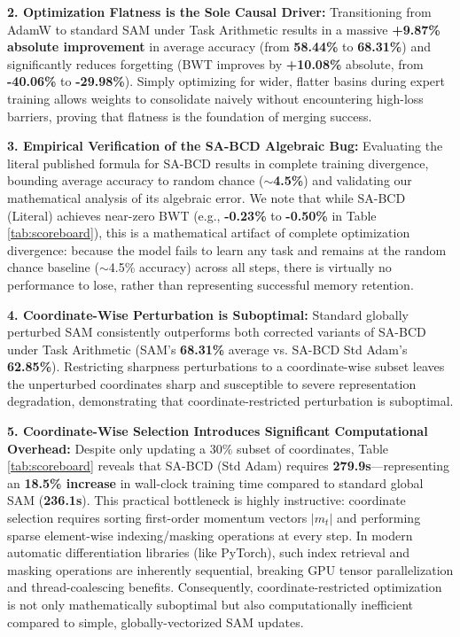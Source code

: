 \textbf{2. Optimization Flatness is the Sole Causal Driver:} Transitioning from AdamW to standard SAM under Task Arithmetic results in a massive \textbf{+9.87\% absolute improvement} in average accuracy (from \textbf{58.44\%} to \textbf{68.31\%}) and significantly reduces forgetting (BWT improves by \textbf{+10.08\%} absolute, from \textbf{-40.06\%} to \textbf{-29.98\%}). Simply optimizing for wider, flatter basins during expert training allows weights to consolidate naively without encountering high-loss barriers, proving that flatness is the foundation of merging success.

\textbf{3. Empirical Verification of the SA-BCD Algebraic Bug:} Evaluating the literal published formula for SA-BCD results in complete training divergence, bounding average accuracy to random chance (\textbf{$\sim$4.5\%}) and validating our mathematical analysis of its algebraic error. We note that while SA-BCD (Literal) achieves near-zero BWT (e.g., \textbf{-0.23\%} to \textbf{-0.50\%} in Table \ref{tab:scoreboard}), this is a mathematical artifact of complete optimization divergence: because the model fails to learn any task and remains at the random chance baseline ($\sim$4.5\% accuracy) across all steps, there is virtually no performance to lose, rather than representing successful memory retention.

\textbf{4. Coordinate-Wise Perturbation is Suboptimal:} Standard globally perturbed SAM consistently outperforms both corrected variants of SA-BCD under Task Arithmetic (SAM's \textbf{68.31\%} average vs. SA-BCD Std Adam's \textbf{62.85\%}). Restricting sharpness perturbations to a coordinate-wise subset leaves the unperturbed coordinates sharp and susceptible to severe representation degradation, demonstrating that coordinate-restricted perturbation is suboptimal.

\textbf{5. Coordinate-Wise Selection Introduces Significant Computational Overhead:} Despite only updating a $30\%$ subset of coordinates, Table \ref{tab:scoreboard} reveals that SA-BCD (Std Adam) requires \textbf{279.9s}—representing an \textbf{18.5\% increase} in wall-clock training time compared to standard global SAM (\textbf{236.1s}). This practical bottleneck is highly instructive: coordinate selection requires sorting first-order momentum vectors $|m_t|$ and performing sparse element-wise indexing/masking operations at every step. In modern automatic differentiation libraries (like PyTorch), such index retrieval and masking operations are inherently sequential, breaking GPU tensor parallelization and thread-coalescing benefits. Consequently, coordinate-restricted optimization is not only mathematically suboptimal but also computationally inefficient compared to simple, globally-vectorized SAM updates.

